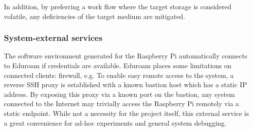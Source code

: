 In addition, by preferring a work flow where the target storage is considered volatile, any deficiencies of the target medium are mitigated.

\subsubsection{System-external services}
The software environment generated for the Raspberry Pi automatically connects to Eduroam if credentials are available.
Eduroam places some limitations on connected clients: firewall, e.g.
To enable easy remote access to the system, a reverse SSH proxy is established with a known bastion host which has a static IP address.
By exposing this proxy via a known port on the bastion, any system connected to the Internet may trivially access the Raspberry Pi remotely via a static endpoint.
While not a necessity for the project itself, this external service is a great convenience for ad-hoc experiments and general system debugging.

